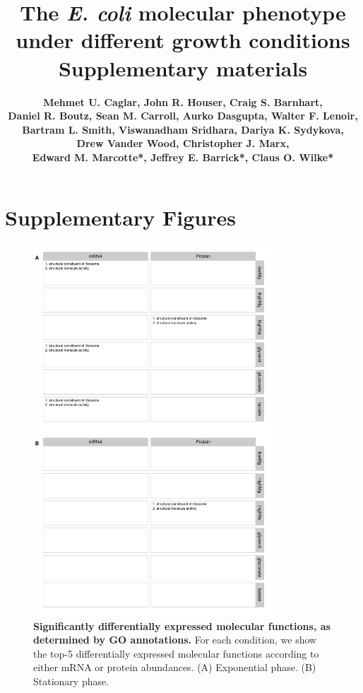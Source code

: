\documentclass[a4paper]{article}
\title{\huge\bfseries \vspace{2cm} The \textit{E. coli} molecular phenotype under different growth conditions \\ \vspace{0.7cm}
	\Large\bfseries Supplementary materials \vspace{1.3cm}}
\author{
	\large\bfseries Mehmet U. Caglar, John R. Houser, Craig S. Barnhart, \\
	\large\bfseries Daniel R. Boutz, Sean M. Carroll, Aurko Dasgupta, Walter F. Lenoir,\\ 
	\large\bfseries Bartram L. Smith, Viswanadham Sridhara, Dariya K. Sydykova, \\
	\large\bfseries Drew Vander Wood, Christopher J. Marx, \\
	\large\bfseries Edward M. Marcotte*, Jeffrey E. Barrick*, Claus O. Wilke*}
\begin{document}
\maketitle
\newpage
	

\listoffigures


\newpage

\section*{Supplementary Figures}

\begin{figure}[!htb]
\centerline{	\includegraphics[width=0.8\textwidth]{../supplementary_figures/figS1_ResultSumamryFigures_mf.pdf}
}
	\caption[Significantly differentially expressed molecular functions]
	{\textbf{Significantly differentially expressed molecular functions, as determined by GO annotations.} For each condition, we show the top-5 differentially expressed molecular functions according to either mRNA or protein abundances. (A) Exponential phase. (B) Stationary phase.}
\end{figure}
\end{document}
